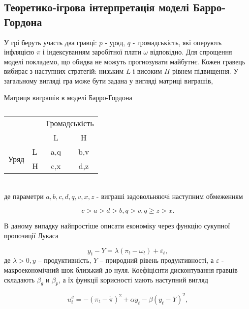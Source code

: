 
\subsection{Теоретико-ігрова інтерпретація моделі Барро-Гордона}

У грі беруть участь два гравці: $p$ - уряд, $q$ - громадськість, які оперують інфляцією $\pi$ і індексуванням заробітної плати $\omega$ відповідно. Для спрощення моделі покладемо, що обидва не можуть прогнозувати майбутнє. Кожен гравець вибирає з наступних стратегій: низьким $L$ і високим  $H$ рівнем підвищення. У загальному вигляді гра може бути задана у вигляді матриці виграшів,
\begin{table}[h]
	\centering
	\caption{}
 Матриця виграшів в моделі Барро-Гордона\\
\normalsize
\begin{tabular}{|l|l|c|c|}
	\hline
	\multicolumn{2}{|l|}{\multirow{2}{*}{}} & \multicolumn{2}{l|}{Громадськість} \\ \cline{3-4} 
	\multicolumn{2}{|l|}{}                  & L                & H                \\ \hline
	\multirow{2}{*}{Уряд}    & L   & a,q              & b,v              \\ \cline{2-4} 
	& H   & c,x              & d,z              \\ \hline
\end{tabular}
\end{table}\\
де параметри $a,b,c,d,q,v,x,z$  - виграші задовольняючi наступним обмеженням~\cite{libich2008macroeconomic}

\begin{equation}
c>a>d>b, q>v, q\geqslant z>x.
\label{eq:sec:ot:restrictions}
\end{equation}

В даному випадку найпростіше описати економіку через функцію сукупної пропозиції Лукаса~\cite{libichIncorpo}

\begin{equation}
\label{eq:sec:ot:lucas}
y_t - Y = \lambda(\pi_t - \omega_t)+\varepsilon_t,
\end{equation}
де  $\lambda>0, y$  – продуктивність, $Y$ – природний рівень продуктивності, а $\varepsilon$ - макроекономічний шок близький до нуля. Коефіцієнти дисконтування гравців складають $\beta_g$ и $\beta_p$, а їх функції корисності мають наступний вигляд

\begin{equation}
\label{eq:sec:ot:govUtil}
u^g_t=-(\pi_t - \tilde{\pi})^2 + \alpha y_t - \beta(y_t-Y)^2,
\end{equation}

